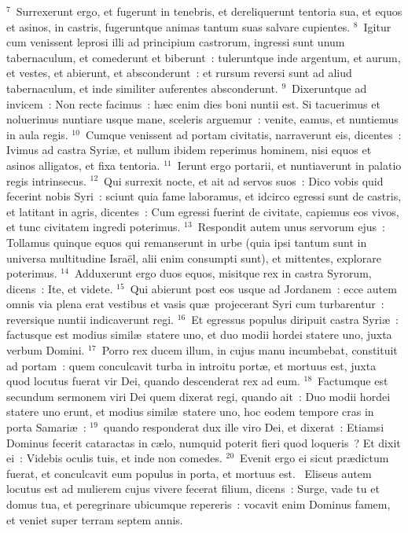 ${}^{7}$~Surrexerunt ergo, et fugerunt in tenebris, et dereliquerunt tentoria sua, et equos et asinos, in castris, fugeruntque animas tantum suas salvare cupientes.
${}^{8}$~Igitur cum venissent leprosi illi ad principium castrorum, ingressi sunt unum tabernaculum, et comederunt et biberunt~: tuleruntque inde argentum, et aurum, et vestes, et abierunt, et absconderunt~: et rursum reversi sunt ad aliud tabernaculum, et inde similiter auferentes absconderunt.
${}^{9}$~Dixeruntque ad invicem~: Non recte facimus~: h\ae c enim dies boni nuntii est. Si tacuerimus et noluerimus nuntiare usque mane, sceleris arguemur~: venite, eamus, et nuntiemus in aula regis.
${}^{10}$~Cumque venissent ad portam civitatis, narraverunt eis, dicentes~: Ivimus ad castra Syri\ae , et nullum ibidem reperimus hominem, nisi equos et asinos alligatos, et fixa tentoria.
${}^{11}$~Ierunt ergo portarii, et nuntiaverunt in palatio regis intrinsecus.
${}^{12}$~Qui surrexit nocte, et ait ad servos suos~: Dico vobis quid fecerint nobis Syri~: sciunt quia fame laboramus, et idcirco egressi sunt de castris, et latitant in agris, dicentes~: Cum egressi fuerint de civitate, capiemus eos vivos, et tunc civitatem ingredi poterimus.
${}^{13}$~Respondit autem unus servorum ejus~: Tollamus quinque equos qui remanserunt in urbe (quia ipsi tantum sunt in universa multitudine Isra\"el, alii enim consumpti sunt), et mittentes, explorare poterimus.
${}^{14}$~Adduxerunt ergo duos equos, misitque rex in castra Syrorum, dicens~: Ite, et videte.
${}^{15}$~Qui abierunt post eos usque ad Jordanem~: ecce autem omnis via plena erat vestibus et vasis qu\ae\ projecerant Syri cum turbarentur~: reversique nuntii indicaverunt regi.
${}^{16}$~Et egressus populus diripuit castra Syri\ae~: factusque est modius simil\ae\ statere uno, et duo modii hordei statere uno, juxta verbum Domini.
${}^{17}$~Porro rex ducem illum, in cujus manu incumbebat, constituit ad portam~: quem conculcavit turba in introitu port\ae , et mortuus est, juxta quod locutus fuerat vir Dei, quando descenderat rex ad eum.
${}^{18}$~Factumque est secundum sermonem viri Dei quem dixerat regi, quando ait~: Duo modii hordei statere uno erunt, et modius simil\ae\ statere uno, hoc eodem tempore cras in porta Samari\ae~:
${}^{19}$~quando responderat dux ille viro Dei, et dixerat~: Etiamsi Dominus fecerit cataractas in c\ae lo, numquid poterit fieri quod loqueris~? Et dixit ei~: Videbis oculis tuis, et inde non comedes.
${}^{20}$~Evenit ergo ei sicut pr\ae dictum fuerat, et conculcavit eum populus in porta, et mortuus est.
~Eliseus autem locutus est ad mulierem cujus vivere fecerat filium, dicens~: Surge, vade tu et domus tua, et peregrinare ubicumque repereris~: vocavit enim Dominus famem, et veniet super terram septem annis.
